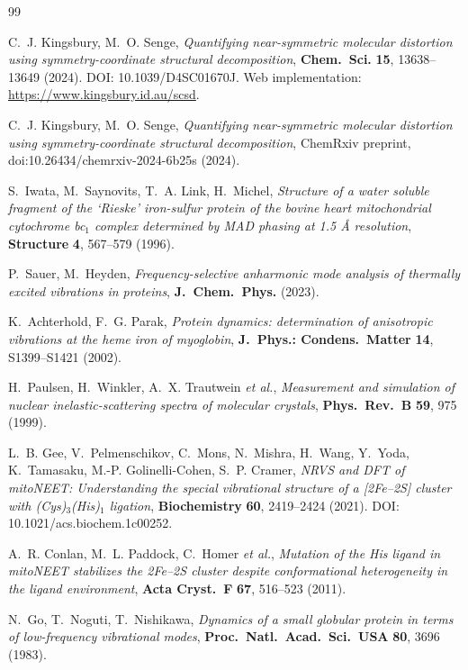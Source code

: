 \documentclass[11pt,a4paper,twoside]{article}
\theoremstyle{remark}
\begin{document}
\begin{thebibliography}{99}

C.~J. Kingsbury, M.~O. Senge,
\emph{Quantifying near-symmetric molecular distortion using
symmetry-coordinate structural decomposition},
\textbf{Chem.\ Sci.} \textbf{15}, 13638--13649 (2024).
DOI: 10.1039/D4SC01670J. Web implementation:
\url{https://www.kingsbury.id.au/scsd}.

C.~J. Kingsbury, M.~O. Senge,
\emph{Quantifying near-symmetric molecular distortion using
symmetry-coordinate structural decomposition},
ChemRxiv preprint, doi:10.26434/chemrxiv-2024-6b25s (2024).

S.~Iwata, M.~Saynovits, T.~A. Link, H.~Michel,
\emph{Structure of a water soluble fragment of the {`Rieske'} iron-sulfur
protein of the bovine heart mitochondrial cytochrome bc$_1$ complex
determined by {MAD} phasing at 1.5 \AA{} resolution},
\textbf{Structure} \textbf{4}, 567--579 (1996).

P.~Sauer, M.~Heyden,
\emph{Frequency-selective anharmonic mode analysis of thermally excited
vibrations in proteins},
\textbf{J.\ Chem.\ Phys.} (2023).

K.~Achterhold, F.~G. Parak,
\emph{Protein dynamics: determination of anisotropic vibrations at the
heme iron of myoglobin},
\textbf{J.\ Phys.: Condens.\ Matter} \textbf{14}, S1399--S1421 (2002).

H.~Paulsen, H.~Winkler, A.~X. Trautwein \emph{et al.},
\emph{Measurement and simulation of nuclear inelastic-scattering spectra
of molecular crystals},
\textbf{Phys.\ Rev.\ B} \textbf{59}, 975 (1999).

L.~B. Gee, V.~Pelmenschikov, C.~Mons, N.~Mishra, H.~Wang, Y.~Yoda,
K.~Tamasaku, M.-P. Golinelli-Cohen, S.~P. Cramer,
\emph{NRVS and DFT of mitoNEET: Understanding the special vibrational
structure of a [2Fe--2S] cluster with (Cys)$_3$(His)$_1$ ligation},
\textbf{Biochemistry} \textbf{60}, 2419--2424 (2021).
DOI: 10.1021/acs.biochem.1c00252.

A.~R. Conlan, M.~L. Paddock, C.~Homer \emph{et al.},
\emph{Mutation of the His ligand in mitoNEET stabilizes the 2Fe--2S
cluster despite conformational heterogeneity in the ligand environment},
\textbf{Acta Cryst.\ F} \textbf{67}, 516--523 (2011).

N.~Go, T.~Noguti, T.~Nishikawa,
\emph{Dynamics of a small globular protein in terms of low-frequency
vibrational modes},
\textbf{Proc.\ Natl.\ Acad.\ Sci.\ USA} \textbf{80}, 3696 (1983).


\end{thebibliography}
\end{document}
